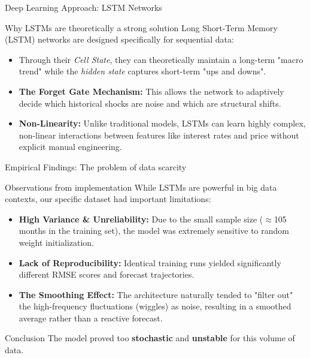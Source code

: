 \documentclass[slidescentered]{beamer}
\begin{document}
\begin{frame}{Deep Learning Approach: LSTM Networks}
    \begin{block}{Why LSTMs are theoretically a strong solution}
        Long Short-Term Memory (LSTM) networks are designed specifically for sequential data:
    \end{block}

    \begin{itemize}
        \item Through their \textit{Cell State}, they can theoretically maintain a long-term "macro trend" while the \textit{hidden state} captures short-term "ups and downs".
        \item \textbf{The Forget Gate Mechanism:} This allows the network to adaptively decide which historical shocks are noise and which are structural shifts.
        \item \textbf{Non-Linearity:} Unlike traditional models, LSTMs can learn highly complex, non-linear interactions between features like interest rates and price without explicit manual engineering.
    \end{itemize}

\end{frame}

\begin{frame}{Empirical Findings: The problem of data scarcity}
    \begin{block}{Observations from implementation}
        While LSTMs are powerful in big data contexts, our specific dataset had important limitations:
    \end{block}

    \begin{itemize}
        \item \textbf{High Variance \& Unreliability:} Due to the small sample size ($\approx$105 months in the training set), the model was extremely sensitive to random weight initialization.
        \item \textbf{Lack of Reproducibility:} Identical training runs yielded significantly different RMSE scores and forecast trajectories.
        \item \textbf{The Smoothing Effect:} The architecture naturally tended to "filter out" the high-frequency fluctuations (wiggles) as noise, resulting in a smoothed average rather than a reactive forecast.
    \end{itemize}

    \begin{alertblock}{Conclusion}
        The model proved too \textbf{stochastic} and \textbf{unstable} for this volume of data.
    \end{alertblock}
\end{frame}
\end{document}
